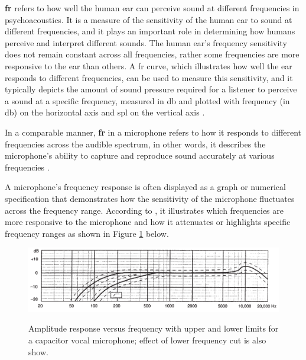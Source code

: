 \textbf{\gls{fr}} refers to how well the human ear can perceive sound at different frequencies in psychoacoustics. It is a measure of the sensitivity of the human ear to sound at different frequencies, and it plays an important role in determining how humans perceive and interpret different sounds. The human ear's frequency sensitivity does not remain constant across all frequencies, rather some frequencies are more responsive to the ear than others. A \gls{fr} curve, which illustrates how well the ear responds to different frequencies, can be used to measure this sensitivity, and it typically depicts the amount of sound pressure required for a listener to perceive a sound at a specific frequency, measured in \gls{db} and plotted with frequency (in \gls{db}) on the horizontal axis and \gls{spl} on the vertical axis \cite{Moore2013}.

In a comparable manner, \textbf{\gls{fr}} in a microphone refers to how it responds to different frequencies across the audible spectrum, in other words, it describes the microphone's ability to capture and reproduce sound accurately at various frequencies \cite{Rayburn2004}.

A microphone's frequency response is often displayed as a graph or numerical specification that demonstrates how the sensitivity of the microphone fluctuates across the frequency range. According to \textcite{Rayburn2004}, it illustrates which frequencies are more responsive to the microphone and how it attenuates or highlights specific frequency ranges as shown in Figure \ref{fig:frmwk_microphone_frequency_response} below.

\begin{figure}[htbp]
    \raggedright
        \caption{Amplitude response versus frequency with upper and lower limits for a capacitor vocal microphone; effect of lower frequency cut is also show.}
        \includegraphics[width=1\textwidth]{resources/images/030-theoretical_framework/Framework_microphone_frequency_response.png}
        \label{fig:frmwk_microphone_frequency_response}
\end{figure}

